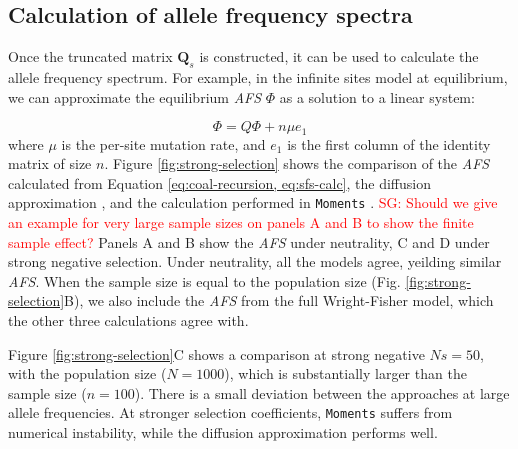 \documentclass[review]{elsarticle}
\newcommand{\sgcomment}[1]{\textcolor{red}{SG: #1}}
\begin{document}

\subsection{Calculation of allele frequency spectra}
\label{subsec:afs}

Once the truncated matrix $\mathbf{Q}_s$ is constructed, it can be used to calculate the allele
frequency spectrum. For example, in the infinite sites model at equilibrium, we can approximate the equilibrium
\textit{AFS} $\Phi$ as a solution to a linear system:

\begin{equation}
  \label{eq:sfs-calc}
  \Phi = Q \Phi  + n \mu e_1
\end{equation}
where $\mu$ is the per-site mutation rate, and $e_1$ is the first column of the identity matrix of
size $n$. Figure \ref{fig:strong-selection} shows the comparison of the \textit{AFS} calculated from
Equation \eqref{eq:coal-recursion, eq:sfs-calc}, the diffusion approximation \cite[eq.
9.23]{Ewens2004}, and the calculation performed in \texttt{Moments} \citep{JouganousEtAl2017}.
\sgcomment{Should we give an example for very large sample sizes on panels A and B to show the finite sample effect?} 
Panels A and B show the \textit{AFS} under neutrality, C and D under strong negative selection.
Under neutrality, all the models agree, yeilding similar \textit{AFS}. When the sample size is equal
to the population size (Fig. \ref{fig:strong-selection}B), we also include the \textit{AFS} from the
full Wright-Fisher model, which the other three calculations agree with.

Figure \ref{fig:strong-selection}C shows a comparison at strong negative $Ns=50$, with the population
size ($N=1000$), which is substantially larger than the sample size ($n=100$). There is a small
deviation between the approaches at large allele frequencies. At stronger selection coefficients,
\texttt{Moments} suffers from numerical instability, while the diffusion approximation performs
well.
\end{document}
